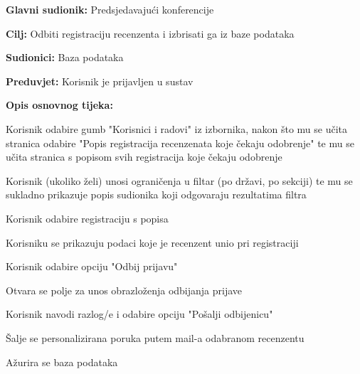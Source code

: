 					\noindent {}
					\begin{packed_item}
	
						\item \textbf{Glavni sudionik: } Predsjedavajući konferencije
						\item  \textbf{Cilj:} Odbiti registraciju recenzenta i izbrisati ga iz baze podataka
						\item  \textbf{Sudionici:} Baza podataka
						\item  \textbf{Preduvjet:} Korisnik je prijavljen u sustav
						\item  \textbf{Opis osnovnog tijeka:}
						
						\item[] \begin{packed_enum}

							\item Korisnik odabire gumb "Korisnici i radovi" iz izbornika, nakon što mu se učita stranica odabire "Popis registracija recenzenata koje čekaju odobrenje" te mu se učita stranica s popisom svih registracija koje čekaju odobrenje
							\item Korisnik (ukoliko želi) unosi ograničenja u filtar (po državi, po sekciji) te mu se sukladno prikazuje popis sudionika koji odgovaraju rezultatima filtra
							\item Korisnik odabire registraciju s popisa
							\item Korisniku se prikazuju podaci koje je recenzent unio pri registraciji
							\item Korisnik odabire opciju "Odbij prijavu"
							\item Otvara se polje za unos obrazloženja odbijanja prijave
							\item Korisnik navodi razlog/e i odabire opciju "Pošalji odbijenicu"
							\item Šalje se personalizirana poruka putem mail-a odabranom recenzentu
							\item Ažurira se baza podataka

					
						\end{packed_enum}
			
					\end{packed_item}



